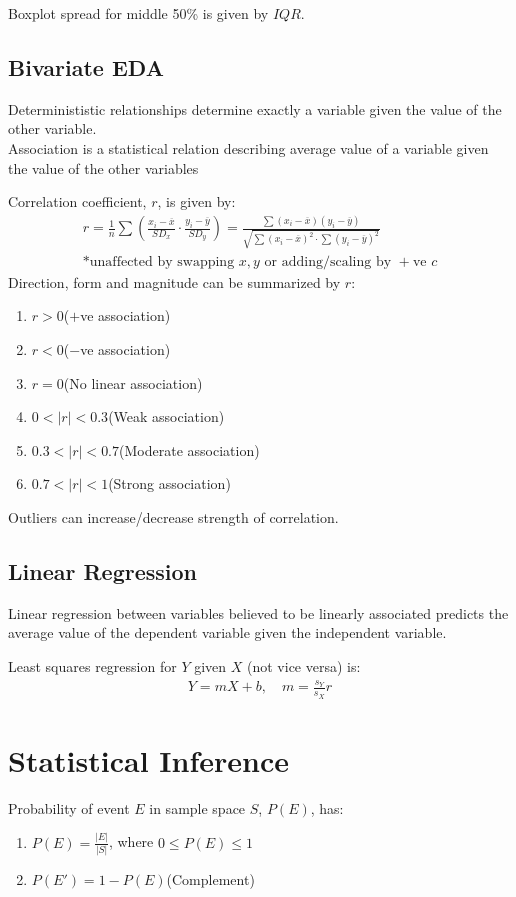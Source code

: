 \documentclass[12pt, a4paper]{article}
\begin{document}
\begin{multicols*}{3}
Boxplot spread for middle 50\% is given by $IQR$.

\subsection{Bivariate EDA}
Determinististic relationships determine exactly a variable given the value of the other variable.\\Association is a statistical relation describing average value of a variable given the value of the other variables

Correlation coefficient, $r$, is given by:
\begin{gather*}
  r = \frac{1}{n}\sum\left(\frac{x_i-\overline{x}}{SD_x}\cdot \frac{y_i-\overline{y}}{SD_y}\right) = \frac{\sum(x_i-\overline{x})(y_i-\overline{y})}{\sqrt{\sum(x_i-\overline{x})^2\cdot\sum(y_i-\overline{y})^2}}\\
  \text{*unaffected by swapping $x,y$ or adding/scaling by $+$ve $c$}
\end{gather*}
Direction, form and magnitude can be summarized by $r$:
\begin{enumerate}[\roman*.]
  \item $r > 0$\hfill($+$ve association)
  \item $r < 0$\hfill($-$ve association)
  \item $r=0$\hfill(No linear association)
  \item $0 < |r| < 0.3$\hfill(Weak association)
  \item $0.3 < |r| < 0.7$\hfill(Moderate association)
  \item $0.7 < |r| < 1$\hfill(Strong association)
\end{enumerate}
Outliers can increase/decrease strength of correlation.

\subsection{Linear Regression}
Linear regression between variables believed to be linearly associated predicts the average value of the dependent variable given the independent variable.

Least squares regression for $Y$ given $X$ (not vice versa) is:
\begin{align*}
  Y = mX + b,\quad m=\frac{s_Y}{s_X}r
\end{align*}

\section{Statistical Inference}
Probability of event $E$ in sample space $S$, $P(E)$, has:
\begin{enumerate}[\roman*.]
  \item $P(E) = \frac{|E|}{|S|}$, where $0 \leq P(E) \leq 1$
  \item $P(E') = 1 - P(E)$\hfill(Complement)
\end{enumerate}


\end{multicols*}
\end{document}
